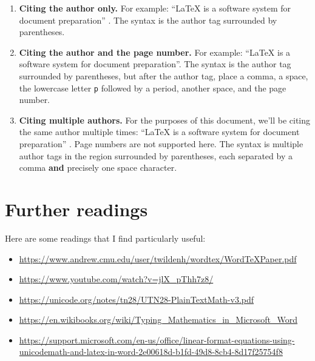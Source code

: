 \documentclass[
]{article}
\theoremstyle{plain}
\theoremstyle{remark}
\theoremstyle{definition}
\begin{document}
\begin{enumerate}
\def\labelenumi{\arabic{enumi}.}
\item
  \textbf{Citing the author only.} For example: ``LaTeX is a software
  system for document preparation'' \cite{sampleArticle}. The syntax is the
  author tag surrounded by parentheses.
\item
  \textbf{Citing the author and the page number.} For example: ``LaTeX
  is a software system for document preparation''\cite[1]{sampleArticle}.
  The syntax is the author tag surrounded by parentheses, but after the
  author tag, place a comma, a space, the lowercase letter \texttt{p}
  followed by a period, another space, and the page number.
\item
  \textbf{Citing multiple authors.} For the purposes of this document,
  we'll be citing the same author multiple times: ``LaTeX is a software
  system for document preparation'' \cite{sampleArticle,sampleArticle}. Page numbers are not supported here. The syntax is
  multiple author tags in the region surrounded by parentheses, each
  separated by a comma \textbf{and} precisely one space character.
\end{enumerate}



\medskip
\printbibliography[heading=bibnumbered]

\section{Further readings}

Here are some readings that I find particularly useful:

\begin{itemize}
\item
  \url{https://www.andrew.cmu.edu/user/twildenh/wordtex/WordTeXPaper.pdf}
\item
  \url{https://www.youtube.com/watch?v=jlX_pThh7z8/}
\item
  \url{https://unicode.org/notes/tn28/UTN28-PlainTextMath-v3.pdf}
\item
  \url{https://en.wikibooks.org/wiki/Typing_Mathematics_in_Microsoft_Word}
\item
  \url{https://support.microsoft.com/en-us/office/linear-format-equations-using-unicodemath-and-latex-in-word-2e00618d-b1fd-49d8-8cb4-8d17f25754f8}
\end{itemize}
\end{document}
